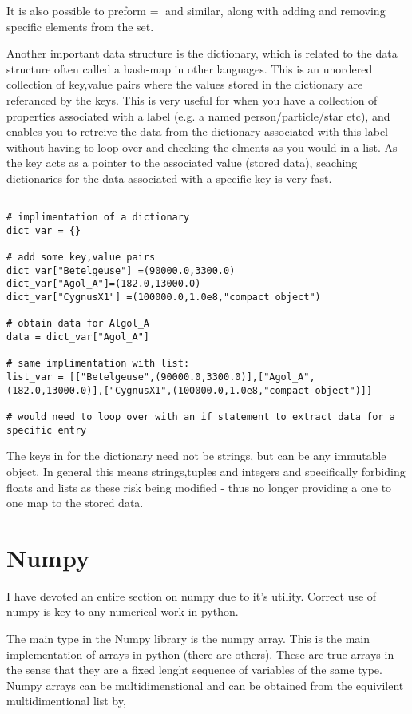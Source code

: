 \documentclass[11pt,a4paper]{article}
\begin{document}
It is also possible to preform \verb||=| and similar, along with adding and removing specific elements from the set.

Another important data structure is the dictionary, which is related to the data structure often called a hash-map in other languages. This is an unordered collection of key,value pairs where the values stored in the dictionary are referanced by the keys. This is very useful for when you have a collection of properties associated with a label (e.g. a named person/particle/star etc), and enables you to retreive the data from the dictionary associated with this label without having to loop over and checking the elments as you would in a list. As the key acts as a pointer to the associated value (stored data), seaching dictionaries for the data associated with a specific key is very fast.

\begin{verbatim}

# implimentation of a dictionary
dict_var = {}

# add some key,value pairs
dict_var["Betelgeuse"] =(90000.0,3300.0)
dict_var["Agol_A"]=(182.0,13000.0)
dict_var["CygnusX1"] =(100000.0,1.0e8,"compact object")

# obtain data for Algol_A
data = dict_var["Agol_A"]

# same implimentation with list:
list_var = [["Betelgeuse",(90000.0,3300.0)],["Agol_A",(182.0,13000.0)],["CygnusX1",(100000.0,1.0e8,"compact object")]]

# would need to loop over with an if statement to extract data for a specific entry

\end{verbatim}

The keys in for the dictionary need not be strings, but can be any immutable object. In general this means strings,tuples and integers and specifically forbiding floats and lists as these risk being modified - thus no longer providing a one to one map to the stored data.

\section{Numpy}

I have devoted an entire section on numpy due to it's utility. Correct use of numpy is key to any numerical work in python.

The main type in the Numpy library is the numpy array. This is the main implementation of arrays in python (there are others). These are true arrays in the sense that they are a fixed lenght sequence of variables of the same type. Numpy arrays can be multidimenstional and can be obtained from the equivilent multidimentional list by,
\end{document}
